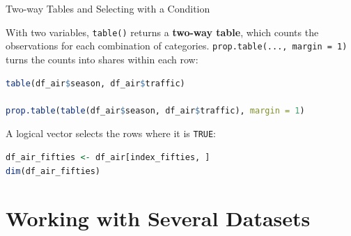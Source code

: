 \documentclass[9pt,aspectratio=169]{beamer}
\begin{document}
\begin{frame}[fragile]{Two-way Tables and Selecting with a Condition}

With two variables, \texttt{table()} returns a \textbf{two-way table}, which counts the observations for each combination of categories. \texttt{prop.table(..., margin = 1)} turns the counts into shares within each row:
\begin{lstlisting}[language=R, basicstyle=\ttfamily\small]
table(df_air$season, df_air$traffic)

prop.table(table(df_air$season, df_air$traffic), margin = 1)
\end{lstlisting}
\pause
A logical vector selects the rows where it is \texttt{TRUE}:
\begin{lstlisting}[language=R, basicstyle=\ttfamily\small]
df_air_fifties <- df_air[index_fifties, ]
dim(df_air_fifties)
\end{lstlisting}
\end{frame}


\section{Working with Several Datasets}
\end{document}
